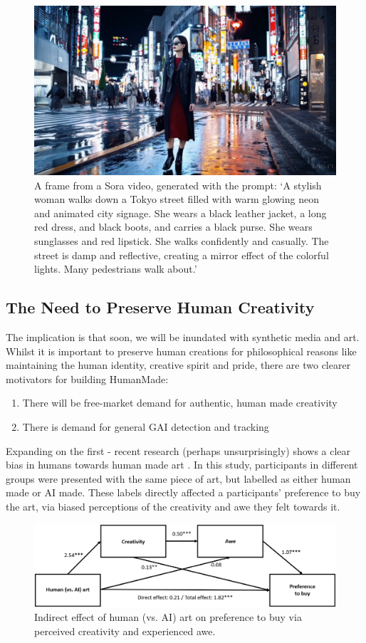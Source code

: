\documentclass[12pt,a4paper]{article}
\begin{document}
\begin{figure}[H]
    \centering
    \includegraphics[scale=0.4]{sora.jpg}
    \caption{A frame from a Sora video, generated with the prompt: `A stylish woman walks down a Tokyo street filled with warm glowing neon and animated city signage. She wears a black leather jacket, a long red dress, and black boots, and carries a black purse. She wears sunglasses and red lipstick. She walks confidently and casually. The street is damp and reflective, creating a mirror effect of the colorful lights. Many pedestrians walk about.'}
\end{figure}
\subsection{The Need to Preserve Human Creativity}
The implication is that soon, we will be inundated with synthetic media and art. Whilst it is important to preserve human creations for philosophical reasons like maintaining the human identity, creative spirit and pride, there are two clearer motivators for building HumanMade:
\begin{enumerate}
    \item There will be free-market demand for authentic, human made creativity
    \item There is demand for general GAI detection and tracking
\end{enumerate}
Expanding on the first - recent research (perhaps unsurprisingly) shows a clear bias in humans towards human made art \cite{anthropocentric}. In this study, participants in different groups were presented with the same piece of art, but labelled as either human made or AI made. These labels directly affected a participants' preference to buy the art, via biased perceptions of the creativity and awe they felt towards it.
\begin{figure}[H]
    \centering
    \includegraphics[scale=1]{biasDiagram.jpg}
    \caption{Indirect effect of human (vs. AI) art on preference to buy via perceived creativity and experienced awe.}
\end{figure}
\end{document}
